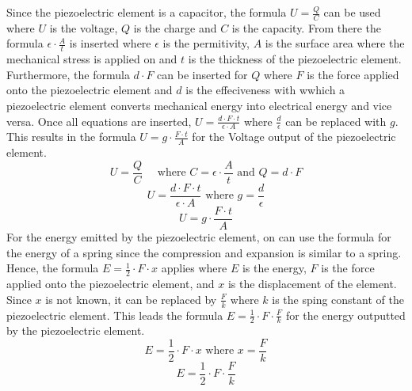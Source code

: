 Since the piezoelectric element is a capacitor, the formula $U=\frac{Q}{C}$ can be used where $U$ is the voltage, $Q$ is the charge and $C$ is the capacity. From there the formula $\epsilon \cdot \frac{A}{t}$ is inserted where $\epsilon$ is the permitivity, $A$ is the surface area where the mechanical stress is applied on and $t$ is the thickness of the piezoelectric element. Furthermore, the formula $d \cdot F$ can be inserted for $Q$ where $F$ is the force applied onto the piezoelectric element and $d$ is the effeciveness with wwhich a piezoelectric element converts mechanical energy into electrical energy and vice versa. Once all equations are inserted, $U=\frac{d \cdot F \cdot t}{\epsilon \cdot A}$ where $\frac{d}{\epsilon}$ can be replaced with $g$. This results in the formula $U = g \cdot \frac{F \cdot t}{A}$ for the Voltage output of the piezoelectric element. \cite{F3lixTutorial2023}
$$
U = \frac{Q}{C} \quad \text{ where } C = \epsilon \cdot \frac{A}{t} \text{ and } Q = d \cdot F
$$
$$
U = \frac{d \cdot F \cdot t}{\epsilon \cdot A} \text{ where } g = \frac{d}{\epsilon}
$$
$$
U = g \cdot \frac{F \cdot t}{A}
$$
For the energy emitted by the piezoelectric element, on can use the formula for the energy of a spring since the compression and expansion is similar to a spring. Hence, the formula $E = \frac 1 2 \cdot F \cdot x$ applies where $E$ is the energy, $F$ is the force applied onto the piezoelectric element, and $x$ is the displacement of the element. Since $x$ is not known, it can be replaced by $\frac{F}{k}$ where $k$ is the sping constant of the piezoelectric element. This leads the formula $E = \frac{1}{2} \cdot F \cdot \frac F k$ for the energy outputted by the piezoelectric element.
$$
E = \frac{1}{2} \cdot F \cdot x \text{ where } x = \frac{F}{k}
$$
$$
E = \frac{1}{2} \cdot F \cdot \frac{F}{k}
$$